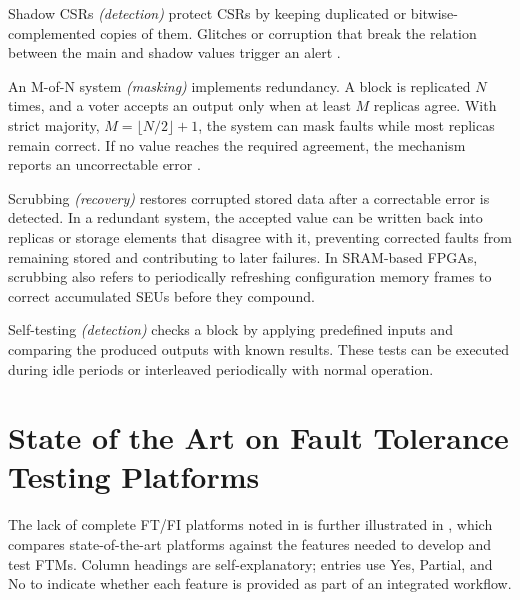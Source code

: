 Shadow \acp{CSR} \emph{(detection)} protect \acp{CSR} by keeping duplicated or bitwise-complemented copies of them. Glitches or corruption that break the relation between the main and shadow values trigger an alert \cite{ibex}.

An M-of-N system \emph{(masking)} implements redundancy. A block is replicated \(N\) times, and a voter accepts an output only when at least \(M\) replicas agree. With strict majority, \(M=\lfloor N/2 \rfloor+1\), the system can mask faults while most replicas remain correct. If no value reaches the required agreement, the mechanism reports an uncorrectable error \cite{Lyons1962}.

Scrubbing \emph{(recovery)} restores corrupted stored data after a correctable error is detected. In a redundant system, the accepted value can be written back into replicas or storage elements that disagree with it, preventing corrected faults from remaining stored and contributing to later failures. In \ac{SRAM}-based \acp{FPGA}, scrubbing also refers to periodically refreshing configuration memory frames to correct accumulated \acp{SEU} before they compound.

Self-testing \emph{(detection)} checks a block by applying predefined inputs and comparing the produced outputs with known results. These tests can be executed during idle periods or interleaved periodically with normal operation.




\section{State of the Art on Fault Tolerance Testing Platforms}
\label{chap2:existing_tools}

The lack of complete \ac{FT}/\ac{FI} platforms noted in  is further illustrated in , which compares state-of-the-art platforms against the features needed to develop and test \acp{FTM}. Column headings are self-explanatory; entries use Yes, Partial, and No to indicate whether each feature is provided as part of an integrated workflow.


